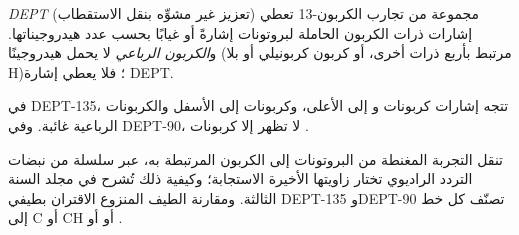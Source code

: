 \begin{definition}\label{def:b2:structure-determination:dept}
\emph{DEPT} (تعزيز غير مشوِّه بنقل الاستقطاب) مجموعة من تجارب الكربون-13
تعطي إشارات ذرات الكربون الحاملة لبروتونات إشارةً أو غيابًا بحسب
عدد هيدروجيناتها. و\emph{الكربون الرباعي} لا يحمل هيدروجينًا
(مرتبط بأربع ذرات أخرى، أو كربون كربونيلي أو  بلا H)؛ فلا يعطي إشارة DEPT.
\end{definition}

\begin{proposition}\label{prop:b2:structure-determination:dept}
في DEPT-135، تتجه إشارات كربونات  و إلى الأعلى، وكربونات  إلى الأسفل والكربونات الرباعية
غائبة. وفي DEPT-90، لا تظهر إلا كربونات .
\end{proposition}

\admitted

تنقل التجربة المغنطة من البروتونات إلى الكربون المرتبطة به، عبر
سلسلة من نبضات التردد الراديوي تختار زاويتها الأخيرة الاستجابة؛ وكيفية ذلك
تُشرح في مجلد السنة الثالثة. ومقارنة الطيف المنزوع الاقتران بطيفي DEPT-135 وDEPT-90 تصنّف كل
خط إلى C أو CH أو  أو .

